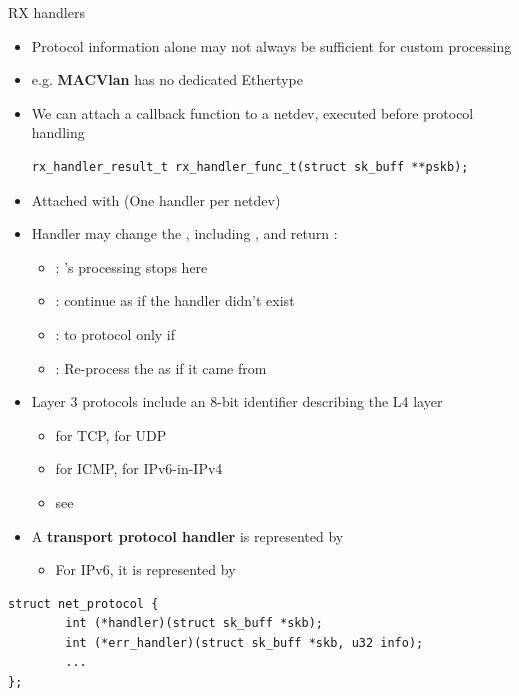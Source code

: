 \begin{frame}[fragile]{RX handlers}
	\begin{itemize}
		\item Protocol information alone may not always be sufficient for custom processing
		\item e.g. \textbf{MACVlan} has no dedicated Ethertype
		\item We can attach a callback function to a netdev, executed before protocol handling \\
			\begin{verbatim}
rx_handler_result_t rx_handler_func_t(struct sk_buff **pskb);
			\end{verbatim}
		\item Attached with  (One handler per netdev)
		\item Handler may change the , including , and return :
			\begin{itemize}
				\item {} : 's processing stops here
				\item {} : continue as if the handler didn't exist
				\item {} :  to protocol only if 
				\item {} : Re-process the  as if it came from 
			\end{itemize}
	\end{itemize}
\end{frame}

\begin{frame}[fragile]{}
	\begin{itemize}
		\item Layer 3 protocols include an 8-bit identifier describing the L4 layer
			\begin{itemize}
				\item {} for TCP,  for UDP
				\item {} for ICMP,  for IPv6-in-IPv4
				\item see 
			\end{itemize}
		\item A \textbf{transport protocol handler} is represented by 
			\begin{itemize}
				\item For IPv6, it is represented by 
			\end{itemize}
	\end{itemize}
	\begin{verbatim}
struct net_protocol {
        int (*handler)(struct sk_buff *skb);
        int (*err_handler)(struct sk_buff *skb, u32 info);
        ...
};

	\end{verbatim}
\end{frame}

